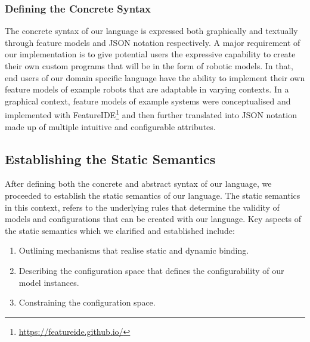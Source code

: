 \documentclass[conference]{IEEEtran}
\newcommand{\foot}[1]{\footnote{\url{#1}}}
\begin{document}
\subsubsection{Defining the Concrete Syntax}
The concrete syntax of our language is expressed both graphically and textually through feature models and JSON notation respectively. A major requirement of our implementation is to give potential users the expressive capability to create their own custom programs that will be in the form of robotic models. In that, end users of our domain specific language have the ability to implement their own feature models of example robots that are adaptable in varying contexts. In a graphical context, feature models of example systems were conceptualised and implemented with FeatureIDE\foot{https://featureide.github.io/} and then further translated into JSON notation made up of multiple intuitive and configurable attributes.

\subsection{Establishing the Static Semantics}
After defining both the concrete and abstract syntax of our language, we proceeded to establish the static semantics of our language. The static semantics in this context, refers to the underlying rules that determine the validity of models and configurations that can be created with our language. Key aspects of the static semantics which we clarified and established include:
\begin{enumerate}
    \item Outlining mechanisms that realise static and dynamic binding.
    \item Describing the configuration space that defines the configurability of our model instances.
    \item Constraining the configuration space.
\end{enumerate}
\end{document}
